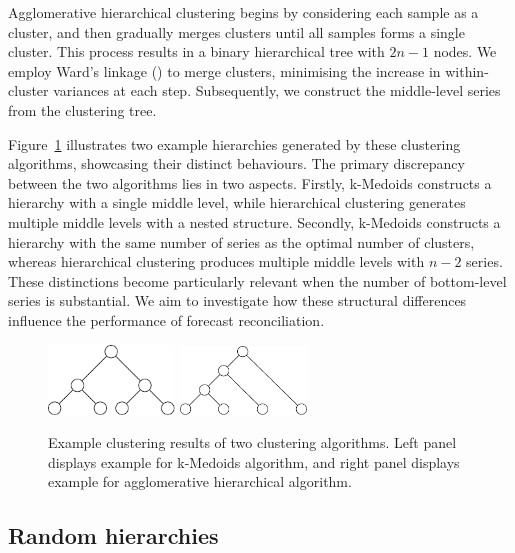 \documentclass[a4paper,review,12pt,authoryear]{elsarticle}
\begin{document}
Agglomerative hierarchical clustering begins by considering each sample as a cluster, and then gradually merges clusters until all samples forms a single cluster. 
This process results in a binary hierarchical tree with $2n-1$ nodes. We employ Ward's linkage (\citealp{murtaghWardHierarchicalAgglomerative2014a}) to merge clusters, minimising the increase in within-cluster variances at each step. Subsequently, we construct the middle-level series from the clustering tree. 

Figure~\ref{fig:cluster_example} illustrates two example hierarchies generated by these clustering algorithms, showcasing their distinct behaviours. 
The primary discrepancy between the two algorithms lies in two aspects. Firstly, k-Medoids constructs a hierarchy with a single middle level, while hierarchical clustering generates multiple middle levels with a nested structure. 
Secondly, k-Medoids constructs a hierarchy with the same number of series as the optimal number of clusters, whereas hierarchical clustering produces multiple middle levels with $n-2$ series.
These distinctions become particularly relevant when the number of bottom-level series is substantial.
We aim to investigate how these structural differences influence the performance of forecast reconciliation.

\begin{figure}
    \centering
    \includegraphics[width=0.3\textwidth]{figures/pamcluster.pdf}
    \hspace{1cm}
    \includegraphics[width=0.3\textwidth]{figures/aggcluster.pdf}
    \caption{\label{fig:cluster_example}Example clustering results of two clustering algorithms. Left panel displays example for k-Medoids algorithm, and right panel displays example for agglomerative hierarchical algorithm.}
\end{figure}

\subsection{Random hierarchies}
\end{document}
